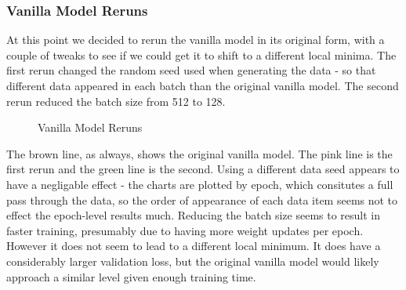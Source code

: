 \documentclass[11pt]{article} %
\theoremstyle{plain}
\theoremstyle{definition}
\begin{document}
\subsubsection{Vanilla Model Reruns}
At this point we decided to rerun the vanilla model in its original form, with a couple of tweaks to see if we could get it to shift to a different local minima. The first rerun changed the random seed used when generating the data - so that different data appeared in each batch than the original vanilla model. The second rerun reduced the batch size from 512 to 128.
\begin{figure}[!ht]
\centering
{}
\newline
{}
\caption{Vanilla Model Reruns}
\label{fig:vanilla_rerun}
\end{figure}
\FloatBarrier
\noindent
The brown line, as always, shows the original vanilla model. The pink line is the first rerun and the green line is the second. Using a different data seed appears to have a negligable effect - the charts are plotted by epoch, which consitutes a full pass through the data, so the order of appearance of each data item seems not to effect the epoch-level results much. Reducing the batch size seems to result in faster training, presumably due to having more weight updates per epoch. However it does not seem to lead to a different local minimum. It does have a considerably larger validation loss, but the original vanilla model would likely approach a similar level given enough training time.
\end{document}
